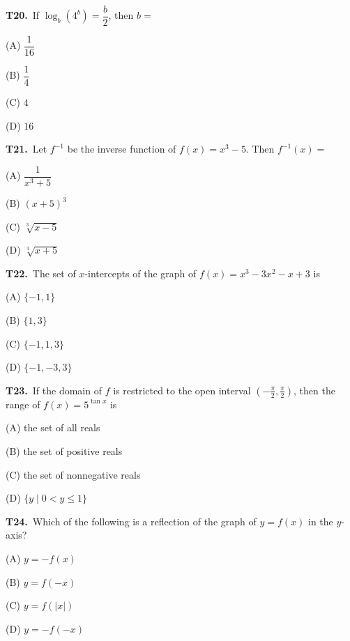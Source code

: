 \documentclass[11pt]{article}
\begin{document}
\bigskip\noindent\textbf{T20.}\ If $\log_b(4^b) = \dfrac{b}{2}$, then $b =$
\begin{list}{}{\setlength{\leftmargin}{3em}\setlength{\labelwidth}{2.5em}\setlength{\itemsep}{0pt}\setlength{\topsep}{2pt}}
\item[(A)] $\dfrac{1}{16}$
\item[(B)] $\dfrac{1}{4}$
\item[(C)] $4$
\item[(D)] $16$
\end{list}

\bigskip\noindent\textbf{T21.}\ Let $f^{-1}$ be the inverse function of $f(x) = x^3 - 5$. Then $f^{-1}(x) =$
\begin{list}{}{\setlength{\leftmargin}{3em}\setlength{\labelwidth}{2.5em}\setlength{\itemsep}{0pt}\setlength{\topsep}{2pt}}
\item[(A)] $\dfrac{1}{x^3+5}$
\item[(B)] $(x+5)^3$
\item[(C)] $\sqrt[3]{x-5}$
\item[(D)] $\sqrt[3]{x+5}$
\end{list}

\bigskip\noindent\textbf{T22.}\ The set of $x$-intercepts of the graph of $f(x) = x^3 - 3x^2 - x + 3$ is
\begin{list}{}{\setlength{\leftmargin}{3em}\setlength{\labelwidth}{2.5em}\setlength{\itemsep}{0pt}\setlength{\topsep}{2pt}}
\item[(A)] $\{-1,1\}$
\item[(B)] $\{1,3\}$
\item[(C)] $\{-1,1,3\}$
\item[(D)] $\{-1,-3,3\}$
\end{list}

\bigskip\noindent\textbf{T23.}\ If the domain of $f$ is restricted to the open interval $\left(-\tfrac{\pi}{2}, \tfrac{\pi}{2}\right)$, then the range of $f(x) = 5^{\tan x}$ is
\begin{list}{}{\setlength{\leftmargin}{3em}\setlength{\labelwidth}{2.5em}\setlength{\itemsep}{0pt}\setlength{\topsep}{2pt}}
\item[(A)] the set of all reals
\item[(B)] the set of positive reals
\item[(C)] the set of nonnegative reals
\item[(D)] $\{y \mid 0 < y \leq 1\}$
\end{list}

\bigskip\noindent\textbf{T24.}\ Which of the following is a reflection of the graph of $y = f(x)$ in the $y$-axis?
\begin{list}{}{\setlength{\leftmargin}{3em}\setlength{\labelwidth}{2.5em}\setlength{\itemsep}{0pt}\setlength{\topsep}{2pt}}
\item[(A)] $y = -f(x)$
\item[(B)] $y = f(-x)$
\item[(C)] $y = f(|x|)$
\item[(D)] $y = -f(-x)$
\end{list}
\end{document}
